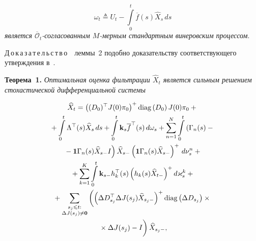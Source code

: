 \begin{multicols}{2}
\begin{enumerate}
      \vspace*{-3pt}
      
      \noindent
  \begin{equation}\label{eq:filt_2}
 \omega_t \triangleq U_t - \int\limits_0^t \overline{f}(s)\widehat{X}_{s}\,ds
 \end{equation}
  \textit{является $\overline{\mathcal{O}}_t$-со\-гла\-со\-ван\-ным $M$-мер\-ным 
  стандартным винеровским процессом}.
 \end{enumerate}

\noindent
 Д\,о\,к\,а\,з\,а\,т\,е\,л\,ь\,с\,т\,в\,о\ \ леммы~2 
 подобно доказательству соответствующего утверждения в~\cite{BS_20}.
 
 \vspace*{2pt}
 
 \noindent
 \textbf{Теорема~1.}
 \textit{Оптимальная оценка фильтрации $\widehat{X}_t$ является сильным 
 решением стохастической дифференциальной системы}
 
     \vspace*{-3pt}
 
 \noindent
 \begin{multline}\label{eq:filt_1}
   \widehat{X}_t =
  \left((D_0)^{\top}J(0)\pi_0\right)^+\mathrm{diag}\left(D_0\right)J(0)\pi_0
   + {}\\
   {}+
   \int\limits_0^t \Lambda^{\top}(s)\widehat{X}_{s}\,ds +
   \int\limits_0^t \mathbf{k}_s \overline{f}^{\top}(s)\,d\omega_s +
   \sum\limits_{n=1}^N\int\limits_{0}^t    \left(
\Gamma_n(s) -{}\right.\\
\left.{}- \mathbf{1}\Gamma_n(s)\widehat{X}_{s-} I
\right)\widehat{X}_{s-}
\left(\mathbf{1}\Gamma_n(s)\widehat{X}_{s-}\right)^+
    \,d\nu_s^n +{} \\
{}    +
   \sum\limits_{k=1}^K\int\limits_{0}^{t}
     \mathbf{k}_{s-}h_k^{\top}(s)
\left( h_k(s)\widehat{X}_{t-}\right)^+ d \varkappa_s^k +{} \\
{}   + \sum\limits_{\substack{{s_j \leqslant t:}\\{\Delta J(s_j) \neq \mathbf{0}}}}
 \left(    \left(
   \Delta D_{s_j}^{\top}\Delta J(s_j)\widehat{X}_{s_j-}\right)^+
   \mathrm{diag}\left(\Delta D_{s_j}\right)\times{}\right.\\
\left.   {}\times \Delta J(s_j) - I
  \vphantom{\left(\Delta D_{s_j}^{\top}\Delta J(s_j)\widehat{X}_{s_j-}\right)^+}
       \right) \widehat{X}_{s_j-},
 \end{multline}
 

\end{multicols}
